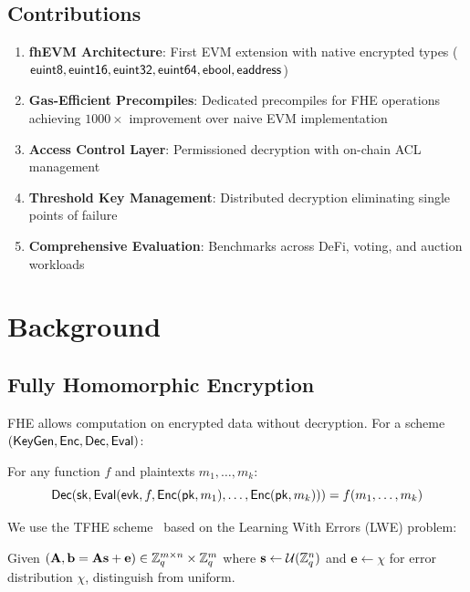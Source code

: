 \documentclass{../shared/luxfhe}
\begin{document}
\subsection{Contributions}

\begin{enumerate}
    \item \textbf{fhEVM Architecture}: First EVM extension with native encrypted types ($\mathsf{euint8}, \mathsf{euint16}, \mathsf{euint32}, \mathsf{euint64}, \mathsf{ebool}, \mathsf{eaddress}$)
    \item \textbf{Gas-Efficient Precompiles}: Dedicated precompiles for FHE operations achieving $1000\times$ improvement over naive EVM implementation
    \item \textbf{Access Control Layer}: Permissioned decryption with on-chain ACL management
    \item \textbf{Threshold Key Management}: Distributed decryption eliminating single points of failure
    \item \textbf{Comprehensive Evaluation}: Benchmarks across DeFi, voting, and auction workloads
\end{enumerate}

\section{Background}

\subsection{Fully Homomorphic Encryption}

FHE allows computation on encrypted data without decryption. For a scheme $(\mathsf{KeyGen}, \mathsf{Enc}, \mathsf{Dec}, \mathsf{Eval})$:

\begin{definition}
For any function $f$ and plaintexts $m_1, \ldots, m_k$:
\[
\mathsf{Dec}(\mathsf{sk}, \mathsf{Eval}(\mathsf{evk}, f, \mathsf{Enc}(\mathsf{pk}, m_1), \ldots, \mathsf{Enc}(\mathsf{pk}, m_k))) = f(m_1, \ldots, m_k)
\]
\end{definition}

We use the TFHE scheme~\cite{tfhe} based on the Learning With Errors (LWE) problem:

\begin{definition}
Given $(\mathbf{A}, \mathbf{b} = \mathbf{A}\mathbf{s} + \mathbf{e}) \in \mathbb{Z}_q^{m \times n} \times \mathbb{Z}_q^m$ where $\mathbf{s} \gets \mathcal{U}(\mathbb{Z}_q^n)$ and $\mathbf{e} \gets \chi$ for error distribution $\chi$, distinguish from uniform.
\end{definition}
\end{document}
